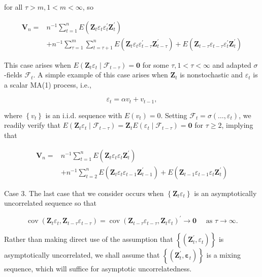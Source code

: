 \documentclass[10pt]{article}
\begin{document}
for all $\tau>m, 1<m<\infty$, so

$$
\begin{aligned}
\mathbf{V}_{n}= & n^{-1} \sum_{t=1}^{n} E\left(\mathbf{Z}_{t} \varepsilon_{t} \varepsilon_{t}^{\prime} \mathbf{Z}_{t}^{\prime}\right) \\
& +n^{-1} \sum_{\tau=1}^{m} \sum_{t=\tau+1}^{n} E\left(\mathbf{Z}_{t} \varepsilon_{t} \varepsilon_{t-\tau}^{\prime} \mathbf{Z}_{t-\tau}^{\prime}\right)+E\left(\mathbf{Z}_{t-\tau} \varepsilon_{t-\tau} \varepsilon_{t}^{\prime} \mathbf{Z}_{t}^{\prime}\right)
\end{aligned}
$$

This case arises when $E\left(\mathbf{Z}_{t} \varepsilon_{t} \mid \mathcal{F}_{t-\tau}\right)=\mathbf{0}$ for some $\tau, 1<\tau<\infty$ and adapted $\sigma$-fields $\mathcal{F}_{t}$. A simple example of this case arises when $\mathbf{Z}_{t}$ is nonstochastic and $\varepsilon_{t}$ is a scalar MA(1) process, i.e.,

$$
\varepsilon_{t}=\alpha v_{t}+v_{t-1},
$$

where $\left\{v_{t}\right\}$ is an i.i.d. sequence with $E\left(v_{t}\right)=0$. Setting $\mathcal{F}_{t}=\sigma\left(\ldots, \varepsilon_{t}\right)$, we readily verify that $E\left(\mathbf{Z}_{t} \varepsilon_{t} \mid \mathcal{F}_{t-\tau}\right)=\mathbf{Z}_{t} E\left(\varepsilon_{t} \mid \mathcal{F}_{t-\tau}\right)=\mathbf{0}$ for $\tau \geq 2$, implying that

$$
\begin{aligned}
\mathbf{V}_{n}= & n^{-1} \sum_{t=1}^{n} E\left(\mathbf{Z}_{t} \varepsilon_{t} \varepsilon_{t} \mathbf{Z}_{t}^{\prime}\right) \\
& +n^{-1} \sum_{t=2}^{n} E\left(\mathbf{Z}_{t} \varepsilon_{t} \varepsilon_{t-1} \mathbf{Z}_{t-1}^{\prime}\right)+E\left(\mathbf{Z}_{t-1} \varepsilon_{t-1} \varepsilon_{t} \mathbf{Z}_{t}^{\prime}\right)
\end{aligned}
$$

Case 3. The last case that we consider occurs when $\left\{\mathbf{Z}_{t} \varepsilon_{t}\right\}$ is an asymptotically uncorrelated sequence so that

$$
\operatorname{cov}\left(\mathbf{Z}_{t} \varepsilon_{t}, \mathbf{Z}_{t-\tau} \varepsilon_{t-\tau}\right)=\operatorname{cov}\left(\mathbf{Z}_{t-\tau} \varepsilon_{t-\tau}, \mathbf{Z}_{t} \varepsilon_{t}\right)^{\prime} \rightarrow \mathbf{0} \quad \text { as } \tau \rightarrow \infty .
$$

Rather than making direct use of the assumption that $\left\{\left(\mathbf{Z}_{t}^{\prime}, \varepsilon_{t}\right)\right\}$ is asymptotically uncorrelated, we shall assume that $\left\{\left(\mathbf{Z}_{t}^{\prime}, \boldsymbol{\varepsilon}_{t}\right)\right\}$ is a mixing sequence, which will suffice for asymptotic uncorrelatedness.
\end{document}
